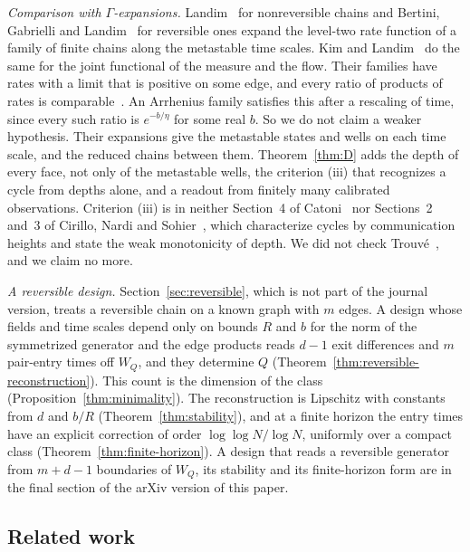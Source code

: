 \emph{Comparison with $\Gamma$-expansions.} Landim~\cite{landim2023} for nonreversible chains and
Bertini, Gabrielli and Landim~\cite{bgl2024} for reversible ones expand the level-two rate
function of a family of finite chains along the metastable time scales. Kim and
Landim~\cite{kl2024} do the same for the joint functional of the measure and the flow. Their
families have rates with a limit that is positive on some edge, and every ratio of products of
rates is comparable~\cite[(2.5)]{kl2024}. An Arrhenius family satisfies this after a rescaling of
time, since every such ratio is $e^{-b/\eta}$ for some real $b$. So we do not claim a weaker
hypothesis. Their expansions give the metastable states and wells on each time scale, and the reduced
chains between them. Theorem~\ref{thm:D} adds the
depth of every face, not only of the metastable wells, the criterion (iii) that recognizes a cycle
from depths alone, and a readout from finitely many calibrated observations. Criterion (iii) is
in neither Section~4 of Catoni~\cite{catoni1999} nor Sections~2 and~3 of Cirillo, Nardi and
Sohier~\cite{cirillonardisohier2015}, which characterize cycles by communication heights and state
the weak monotonicity of depth. We did not check Trouv\'e~\cite{trouve1996}, and we claim no more.

\ifarxivbuild
\emph{A reversible design.} Section~\ref{sec:reversible}, which is not part of the journal
version, treats a reversible chain on a known graph with $m$ edges. A design whose fields and time
scales depend only on bounds $R$ and $b$ for the norm of the symmetrized generator and the edge
products reads $d-1$ exit differences and $m$ pair-entry times off $W_Q$, and they determine $Q$
(Theorem~\ref{thm:reversible-reconstruction}). This count is the dimension of the class
(Proposition~\ref{thm:minimality}). The reconstruction is Lipschitz with constants from $d$ and
$b/R$ (Theorem~\ref{thm:stability}), and at a finite horizon the entry times have an explicit
correction of order $\log\log N/\log N$, uniformly over a compact class
(Theorem~\ref{thm:finite-horizon}).
\else
A design that reads a reversible generator from $m+d-1$ boundaries of $W_Q$, its stability and
its finite-horizon form are in the final section of the arXiv version of this paper.
\fi

\subsection{Related work}\label{sec:related}

